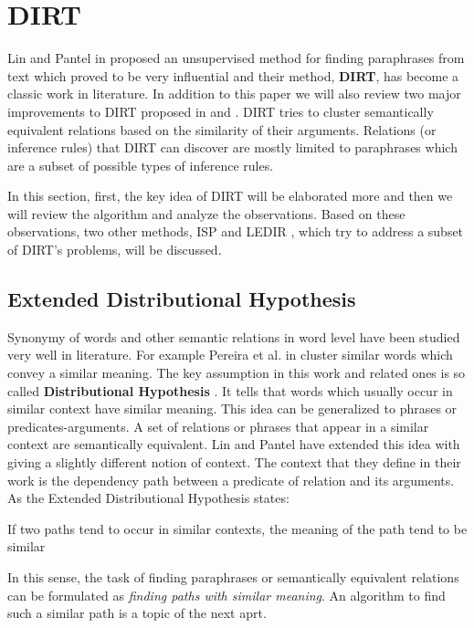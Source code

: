 \documentclass[12pt]{report}
\begin{document}
\section{DIRT}
\label{ch:unsupervised}

Lin and Pantel in \cite{Lin2001} proposed an unsupervised method for finding paraphrases from text which  
proved to be very influential and their method, \textbf{DIRT}, has become a classic work in literature.
 In addition
 to this paper we will also review two major improvements to DIRT proposed in \cite{Bhagat2007} and \cite{Pantel2007}.
DIRT tries to cluster semantically equivalent relations based on the similarity of their arguments. Relations
(or inference rules) that DIRT can discover are mostly limited to paraphrases which are a subset of possible types of inference rules.

In this section, first, the key idea of DIRT will be elaborated more and then we will review the algorithm and analyze the observations.
Based on these observations, two other methods, ISP \cite{Pantel2007} and LEDIR \cite{Bhagat2007}, 
which try to address a subset of DIRT's problems, will be discussed.

\subsection{Extended Distributional Hypothesis}
\label{ch:assumption}

Synonymy of words and other semantic relations in word level have been studied very well in literature.
For example Pereira et al. in \cite{Pereira1993} 
cluster similar words which convey a similar meaning. The key assumption in this work and related ones is so called
 \textbf{Distributional Hypothesis} \cite{Harris1981}
 . It tells that words which usually occur in similar context have similar meaning. This idea can be generalized
  to phrases or predicates-arguments. A set of relations or phrases that appear in a similar context
  are semantically equivalent. Lin and Pantel have extended this idea with giving a slightly different notion
   of context. The context that they define in their work is the dependency path between a predicate of
    relation and its arguments. As the Extended Distributional Hypothesis states:
    \begin{shaded}
     If two paths tend to occur in similar contexts, the meaning of the path tend to be similar 
    \end{shaded}
    
      
    In this sense, the task of finding paraphrases or semantically equivalent relations
     can be formulated as \emph{finding paths with similar meaning}. 
     An algorithm to find such a similar path is a topic of the next aprt.
\end{document}
